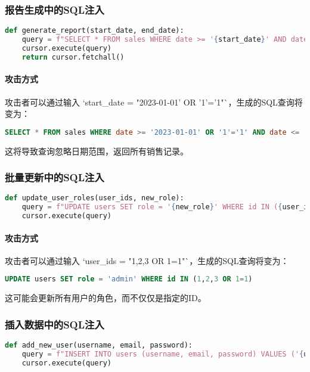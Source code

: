 \documentclass{article}
\begin{document}
\subsubsection{报告生成中的SQL注入}
\begin{lstlisting}[language=Python, caption=报告生成中的SQL注入]
def generate_report(start_date, end_date):
    query = f"SELECT * FROM sales WHERE date >= '{start_date}' AND date <= '{end_date}'"
    cursor.execute(query)
    return cursor.fetchall()
\end{lstlisting}

\paragraph{攻击方式}
攻击者可以通过输入 `start\_date = "2023-01-01' OR '1'='1"`，生成的SQL查询将变为：
\begin{lstlisting}[language=SQL]
SELECT * FROM sales WHERE date >= '2023-01-01' OR '1'='1' AND date <= 'end_date'
\end{lstlisting}
这将导致查询忽略日期范围，返回所有销售记录。

\subsubsection{批量更新中的SQL注入}
\begin{lstlisting}[language=Python, caption=批量更新中的SQL注入]
def update_user_roles(user_ids, new_role):
    query = f"UPDATE users SET role = '{new_role}' WHERE id IN ({user_ids})"
    cursor.execute(query)
\end{lstlisting}

\paragraph{攻击方式}
攻击者可以通过输入 `user\_ids = "1,2,3 OR 1=1"`，生成的SQL查询将变为：
\begin{lstlisting}[language=SQL]
UPDATE users SET role = 'admin' WHERE id IN (1,2,3 OR 1=1)
\end{lstlisting}
这可能会更新所有用户的角色，而不仅仅是指定的ID。

\subsubsection{插入数据中的SQL注入}
\begin{lstlisting}[language=Python, caption=插入数据中的SQL注入]
def add_new_user(username, email, password):
    query = f"INSERT INTO users (username, email, password) VALUES ('{username}', '{email}', '{password}')"
    cursor.execute(query)
\end{lstlisting}
\end{document}
